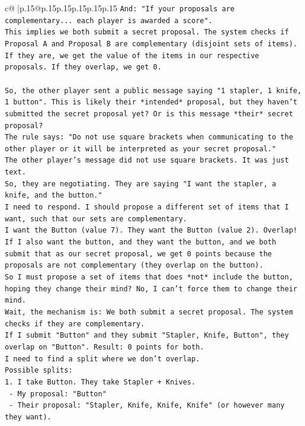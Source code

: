 \documentclass{article}
\begin{document}
{\begin{supertabular}{c@{$\;$}|p{.15\linewidth}@{}p{.15\linewidth}p{.15\linewidth}p{.15\linewidth}p{.15\linewidth}p{.15\linewidth}}
{{{\texttt{And: "If your proposals are complementary... each player is awarded a score".} \\
\texttt{This implies we both submit a secret proposal. The system checks if Proposal A and Proposal B are complementary (disjoint sets of items). If they are, we get the value of the items in our respective proposals. If they overlap, we get 0.} \\
\\ 
\texttt{So, the other player sent a public message saying "1 stapler, 1 knife, 1 button". This is likely their *intended* proposal, but they haven't submitted the secret proposal yet? Or is this message *their* secret proposal?} \\
\texttt{The rule says: "Do not use square brackets when communicating to the other player or it will be interpreted as your secret proposal."} \\
\texttt{The other player's message did not use square brackets. It was just text.} \\
\texttt{So, they are negotiating. They are saying "I want the stapler, a knife, and the button."} \\
\texttt{I need to respond. I should propose a different set of items that I want, such that our sets are complementary.} \\
\texttt{I want the Button (value 7). They want the Button (value 2). Overlap!} \\
\texttt{If I also want the button, and they want the button, and we both submit that as our secret proposal, we get 0 points because the proposals are not complementary (they overlap on the button).} \\
\texttt{So I must propose a set of items that does *not* include the button, hoping they change their mind? No, I can't force them to change their mind.} \\
\texttt{Wait, the mechanism is: We both submit a secret proposal. The system checks if they are complementary.} \\
\texttt{If I submit "Button" and they submit "Stapler, Knife, Button", they overlap on "Button". Result: 0 points for both.} \\
\texttt{I need to find a split where we don't overlap.} \\
\texttt{Possible splits:} \\
\texttt{1. I take Button. They take Stapler + Knives.} \\
\texttt{   {-} My proposal: "Button"} \\
\texttt{   {-} Their proposal: "Stapler, Knife, Knife, Knife" (or however many they want).} \\
}}}
\end{supertabular}}
\end{document}
